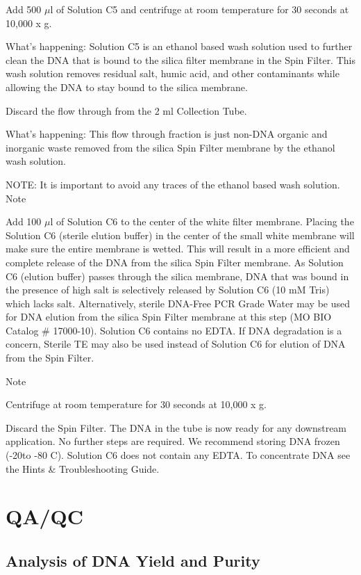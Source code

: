 \documentclass[12pt]{../SOP3_alpha}
\begin{document}
\NP Add 500 $\mu$l of Solution C5 and centrifuge at room temperature for 30 seconds at 10,000 x g.

What's happening: Solution C5 is an ethanol based wash solution used to further clean the DNA that is bound to the silica filter membrane in the
Spin Filter. This wash solution removes residual salt, humic acid, and other contaminants while allowing the DNA to stay bound to the silica membrane.

\NP Discard the flow through from the 2 ml Collection Tube.

What's happening: This flow through fraction is just non-DNA organic and inorganic waste removed from the silica Spin Filter membrane by the ethanol wash solution.


NOTE: It is important to avoid any traces of the ethanol based wash solution.
Note

\NP Add 100 $\mu$l of Solution C6 to the center of the white filter membrane. Placing the Solution C6 (sterile elution buffer) in the center of the small white membrane will make sure the entire membrane is wetted. This will result in a more efficient and complete release of the DNA from the silica Spin Filter membrane. As Solution C6 (elution buffer) passes through the silica membrane, DNA that
was bound in the presence of high salt is selectively released by Solution C6 (10 mM Tris) which lacks salt. Alternatively, sterile DNA-Free PCR Grade Water may be used for DNA elution from the silica Spin Filter membrane at this step (MO BIO Catalog \# 17000-10). Solution C6 contains no EDTA. If DNA degradation is a concern, Sterile TE may also be used instead of Solution C6 for elution of DNA from the Spin Filter.

Note

\NP Centrifuge at room temperature for 30 seconds at 10,000 x g.

\NP Discard the Spin Filter. The DNA in the tube is now ready for any downstream application. No further steps are required. We recommend storing DNA frozen (-20\degree to -80 \degree C). Solution C6 does not contain any EDTA. To concentrate DNA see the Hints \& Troubleshooting Guide.

\section{QA/QC}

\subsection*{Analysis of DNA Yield and Purity}
\end{document}

